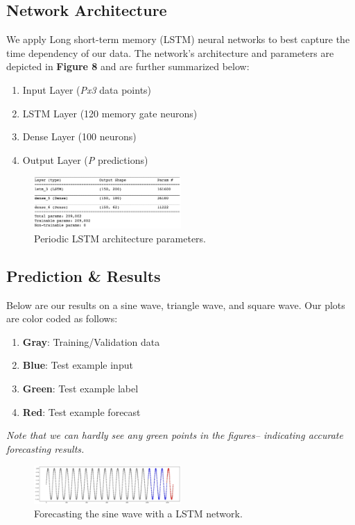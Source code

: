 \documentclass[letterpaper, 10 pt, conference]{ieeeconf}  %
\begin{document}
\subsection{Network Architecture}
We apply Long short-term memory (LSTM) neural networks to best capture the time dependency of our data. The network's architecture and parameters are depicted in \textbf{Figure 8} and are further summarized below:
\begin{enumerate}
\item Input Layer (\textit{Px3} data points)
\item LSTM Layer  (120 memory gate neurons)
\item Dense Layer (100 neurons)
\item Output Layer (\textit{P} predictions)
\end{enumerate}

\label{PeriodicArchParams}
\begin{figure}[h]
	\centering
	\includegraphics[width=0.5\textwidth]{assets/periodic_arch_params.png}
    \caption{Periodic LSTM architecture parameters.}
\end{figure}




\subsection{Prediction \& Results}
Below are our results on a sine wave, triangle wave, and square wave. Our plots are color coded as follows:

\begin{enumerate}
\item \textbf{Gray}: Training/Validation data
\item \textbf{Blue}: Test example input
\item \textbf{Green}: Test example label
\item \textbf{Red}: Test example forecast
\end{enumerate}

\textit{Note that we can hardly see any green points in the figures-- indicating accurate forecasting results.}

\label{SineForecasting}
\begin{figure}[h]
	\centering
	\includegraphics[width=0.5\textwidth]{assets/sine_forecast.png}
    \caption{Forecasting the sine wave with a LSTM network.}
\end{figure}
\end{document}
